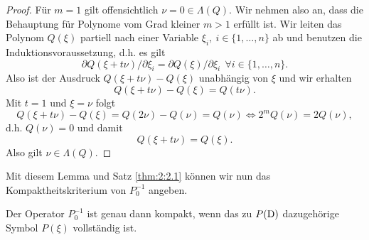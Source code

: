 \begin{proof}
Für $m=1$ gilt offensichtlich $\nu = 0 \in \Lambda(Q)$. Wir nehmen also an, dass die Behauptung für Polynome vom Grad kleiner $m>1$ erfüllt ist. Wir leiten das Polynom $Q(\xi)$ partiell nach einer Variable $\xi_i, \ i \in \{1,\ldots,n\}$ ab und benutzen die Induktionsvoraussetzung, d.h. es gilt
\begin{equation}
\partial Q(\xi + t \nu)/ \partial \xi_i = \partial Q(\xi)/\partial \xi_i \ \ \forall i \in \{1,\ldots,n\}.
\end{equation}
Also ist der Ausdruck $Q(\xi + t \nu) - Q(\xi)$ unabhängig von $\xi$ und wir erhalten
\begin{equation}
Q(\xi + t \nu) - Q(\xi) = Q(t \nu).
\end{equation}
Mit $t=1$ und $\xi=\nu$ folgt
\begin{equation}
Q(\xi + t\nu) - Q(\xi) = Q(2 \nu) - Q(\nu)= Q(\nu) \Leftrightarrow 2^m Q(\nu) = 2 Q(\nu),
\end{equation}
d.h. $Q(\nu)=0$ und damit 
\begin{equation}
Q(\xi + t\nu) = Q(\xi).
\end{equation}
Also gilt $\nu \in \Lambda(Q)$.
\end{proof}
Mit diesem Lemma und Satz \ref{thm:2:2.1} können wir nun das Kompaktheitskriterium von $P_0^{-1}$ angeben.
\begin{thm}
Der Operator $P_0^{-1}$ ist genau dann kompakt, wenn das zu $P(\mathrm D)$ dazugehörige Symbol $P(\xi)$ vollständig ist.
\end{thm}
